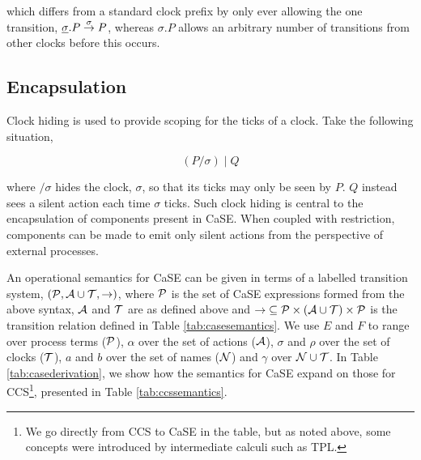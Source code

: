 \noindent which differs from a standard clock prefix by only ever
allowing the one transition, $\underline{\sigma}.P \stackrel{\sigma}{\rightarrow}
P$, whereas $\sigma.P$ allows an arbitrary number of transitions from
other clocks before this occurs.

\subsection{Encapsulation}
\label{encapsulation}

Clock hiding is used to provide scoping for the ticks of a
clock.  Take the following situation,

\begin{equation}
\label{clockhidingex}
  (P / \sigma)\;|\;Q
\end{equation}

\noindent where $/ \sigma$ hides the clock, $\sigma$, so that its
ticks may only be seen by $P$.  $Q$ instead sees a silent action each
time $\sigma$ ticks.  Such clock hiding is central to the
encapsulation of components present in CaSE.  When coupled with
restriction, components can be made to emit only silent actions from
the perspective of external processes.

An operational semantics for CaSE can be given in terms of a labelled
transition system, $(\text{$\mathcal{P}$}, \text{$\mathcal{A}$} \cup \text{$\mathcal{T}$}, \rightarrow)$,
where $\text{$\mathcal{P}$}$ is the set of CaSE expressions formed from the above
syntax, $\text{$\mathcal{A}$}$ and $\text{$\mathcal{T}$}$ are as defined above and
$\mathop{\rightarrow} \mathrel{\subseteq} \text{$\mathcal{P}$} \times (\text{$\mathcal{A}$} \cup
\text{$\mathcal{T}$}) \times \text{$\mathcal{P}$}$ is the transition relation defined in Table
\ref{tab:casesemantics}.  We use $E$ and $F$ to range over process
terms ($\text{$\mathcal{P}$}$), $\alpha$ over the set of actions ($\text{$\mathcal{A}$}$),
$\sigma$ and $\rho$ over the set of clocks ($\text{$\mathcal{T}$}$), $a$ and $b$
over the set of names ($\text{$\mathcal{N}$}$) and $\gamma$ over $\text{$\mathcal{N}$} \cup
\text{$\mathcal{T}$}$. In Table \ref{tab:casederivation}, we show how the semantics
for CaSE expand on those for CCS\footnote{We go directly from CCS to
  CaSE in the table, but as noted above, some concepts were
  introduced by intermediate calculi such as TPL.}, presented in Table
\ref{tab:ccssemantics}.

